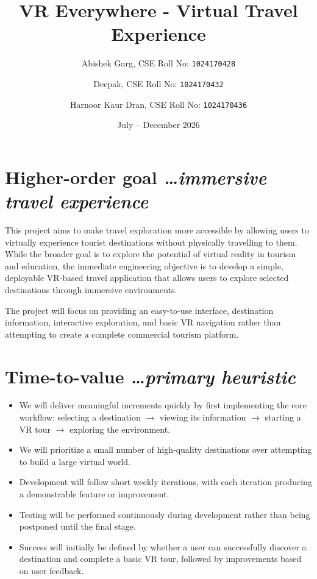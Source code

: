 \documentclass[11pt,a4paper]{article}
\title{VR Everywhere - Virtual Travel Experience}
\author{
  Abishek Garg, CSE
  {Roll No: \texttt{1024170428}}
  \and
  Deepak, CSE
  {Roll No: \texttt{1024170432}}
  \and
  Harnoor Kaur Dran, CSE
  {Roll No: \texttt{1024170436}}
}
\date{July -- December 2026}
\newcommand{\BvrHint}[1]{%
  {\normalfont\normalsize\itshape\hfill #1}}
\begin{document}
\maketitle

\section{Higher-order goal%
  \BvrHint{\ldots immersive travel experience}}

This project aims to make travel exploration more accessible by allowing users to virtually
experience tourist destinations without physically travelling to them. While the broader goal is to
explore the potential of virtual reality in tourism and education, the immediate engineering
objective is to develop a simple, deployable VR-based travel application that allows users to explore
selected destinations through immersive environments.

The project will focus on providing an easy-to-use interface, destination information, interactive
exploration, and basic VR navigation rather than attempting to create a complete commercial
tourism platform.

\section{Time-to-value%
  \BvrHint{\ldots primary heuristic}}

\begin{itemize}[leftmargin=0.7cm]
    \item We will deliver meaningful increments quickly by first implementing the core workflow:
    selecting a destination $\rightarrow$ viewing its information $\rightarrow$ starting a VR tour
    $\rightarrow$ exploring the environment.
    \item We will prioritize a small number of high-quality destinations over attempting to build a large virtual world.
    \item Development will follow short weekly iterations, with each iteration producing a demonstrable feature or improvement.
    \item Testing will be performed continuously during development rather than being postponed until the final stage.
    \item Success will initially be defined by whether a user can successfully discover a destination
    and complete a basic VR tour, followed by improvements based on user feedback.
\end{itemize}
\end{document}

